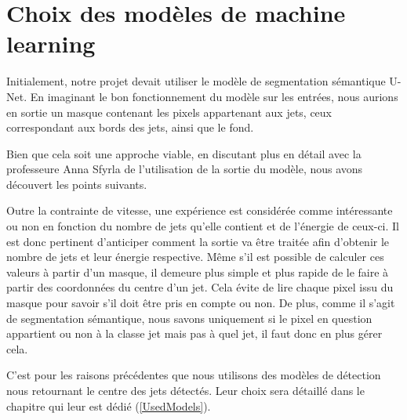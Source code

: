 \section{Choix des modèles de machine learning}

Initialement, notre projet devait utiliser le modèle de segmentation sémantique U-Net. En imaginant le bon fonctionnement du modèle sur les entrées, nous aurions en sortie un masque contenant les pixels appartenant aux jets, ceux correspondant aux bords des jets, ainsi que le fond.

Bien que cela soit une approche viable, en discutant plus en détail avec la professeure Anna Sfyrla de l'utilisation de la sortie du modèle, nous avons découvert les points suivants.

Outre la contrainte de vitesse, une expérience est considérée comme intéressante ou non en fonction du nombre de jets qu'elle contient et de l'énergie de ceux-ci. Il est donc pertinent d'anticiper comment la sortie va être traitée afin d'obtenir le nombre de jets et leur énergie respective. Même s'il est possible de calculer ces valeurs à partir d'un masque, il demeure plus simple et plus rapide de le faire à partir des coordonnées du centre d'un jet. Cela évite de lire chaque pixel issu du masque pour savoir s'il doit être pris en compte ou non. De plus, comme il s'agit de segmentation sémantique, nous savons uniquement si le pixel en question appartient ou non à la classe jet mais pas à quel jet, il faut donc en plus gérer cela.

C'est pour les raisons précédentes que nous utilisons des modèles de détection nous retournant le centre des jets détectés. Leur choix sera détaillé dans le chapitre qui leur est dédié (\ref{UsedModels}).

